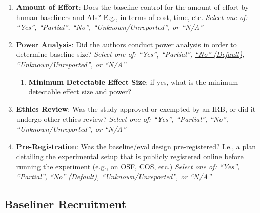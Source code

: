 \documentclass{article}
\begin{document}
\begin{enumerate}[leftmargin=30pt, topsep=0pt, itemsep=0pt]
    \item \textbf{Amount of Effort}: Does the baseline control for the amount of effort by human baseliners and AIs? E.g., in terms of cost, time, etc.
    \newline \textit{Select one of: ``Yes'', ``Partial'', ``No'', ``Unknown/Unreported'', or ``N/A''}
    
    \item \textbf{Power Analysis}: Did the authors conduct power analysis in order to determine baseline size? 
    \newline \textit{Select one of: ``Yes'', ``Partial'', \ul{``No'' (Default)}, ``Unknown/Unreported'', or ``N/A''}
    
    \begin{enumerate}
        \item \textbf{Minimum Detectable Effect Size}: if yes, what is the minimum detectable effect size and power?
    \end{enumerate}
    
    \item \textbf{Ethics Review}: Was the study approved or exempted by an IRB, or did it undergo other ethics review? 
    \newline \textit{Select one of: ``Yes'', ``Partial'', ``No'', ``Unknown/Unreported'', or ``N/A''}
    
    \item \textbf{Pre-Registration}: Was the baseline/eval design pre-registered? I.e., a plan detailing the experimental setup that is publicly registered online before running the experiment (e.g., on OSF, COS, etc.) 
    \newline \textit{Select one of: ``Yes'', ``Partial'', \ul{``No'' (Default)}, ``Unknown/Unreported'', or ``N/A''}
\end{enumerate}

\subsection{Baseliner Recruitment}

\renewcommand{\labelenumi}{2.\arabic{enumi}}
\renewcommand{\labelenumii}{2.\arabic{enumi}.\arabic{enumii}}
\renewcommand{\labelenumiii}{2.\arabic{enumi}.\arabic{enumii}.\arabic{enumiii}}
\end{document}
